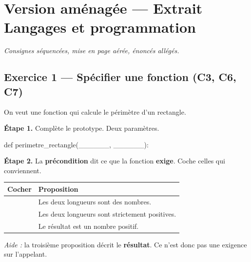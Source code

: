 \section*{Version aménagée --- Extrait Langages et programmation}
\textit{Consignes séquencées, mise en page aérée, énoncés allégés.}

\bigskip

\subsection*{Exercice 1 --- Spécifier une fonction (C3, C6, C7)}

On veut une fonction qui calcule le périmètre d'un rectangle.

\bigskip

\textbf{Étape 1.} Complète le prototype. Deux paramètres.

\begin{python}
def perimetre_rectangle(______, ______):
\end{python}

\bigskip

\textbf{Étape 2.} La \textbf{précondition} dit ce que la fonction \textbf{exige}.
Coche celles qui conviennent.

\bigskip

\begin{center}
\begin{tabular}{|c|l|}
\hline
\textbf{Cocher} & \textbf{Proposition} \\
\hline
\dotfill & Les deux longueurs sont des nombres. \\
\hline
\dotfill & Les deux longueurs sont strictement positives. \\
\hline
\dotfill & Le résultat est un nombre positif. \\
\hline
\end{tabular}
\end{center}

\medskip
\textit{Aide :} la troisième proposition décrit le \textbf{résultat}. Ce n'est donc pas
une exigence sur l'appelant.

